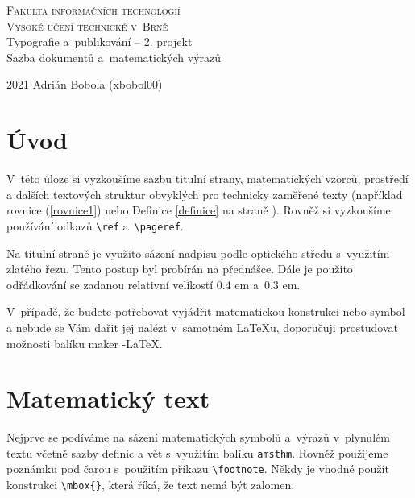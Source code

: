 \documentclass[11pt,a4paper,twocolumn]{article}
\begin{document}
\begin{titlepage}
\date{}
\begin{center}
\Huge\textsc{Fakulta informačních technologií \\
Vysoké učení technické v~Brně} \\
\LARGE Typografie a~publikování -- 2. projekt \\
Sazba dokumentů a~matematických výrazů \\
\end{center}
{\Large{2021\hfill
Adrián Bobola (xbobol00)}}
\end{titlepage}

\section*{Úvod}
V~této úloze si vyzkoušíme sazbu titulní strany, matematických vzorců, prostředí a dalších textových struktur obvyk\-lých pro technicky zaměřené texty (například rovnice (\ref{rovnice1})
nebo Definice \ref{definice} na straně \pageref{definice}). Rovněž si vyzkoušíme používání odkazů \verb|\ref| a~\verb|\pageref|.

Na titulní straně je využito sázení nadpisu podle optického středu s~využitím zlatého řezu. Tento postup byl
probírán na přednášce. Dále je použito odřádkování se
zadanou relativní velikostí 0.4 em a~0.3 em.

V~případě, že budete potřebovat vyjádřit matematickou
konstrukci nebo symbol a nebude se Vám dařit jej nalézt
v~samotném \LaTeX u, doporučuji prostudovat možnosti balíku maker \AmS-\LaTeX.

\section{Matematický text}
Nejprve se podíváme na sázení matematických symbolů
a~výrazů v~plynulém textu včetně sazby definic a vět s~využitím balíku \verb|amsthm|. Rovněž použijeme poznámku pod
čarou s~použitím příkazu \verb|\footnote|. Někdy je vhodné
použít konstrukci \verb|\mbox{}|, která říká, že text nemá být
zalomen.
\end{document}
